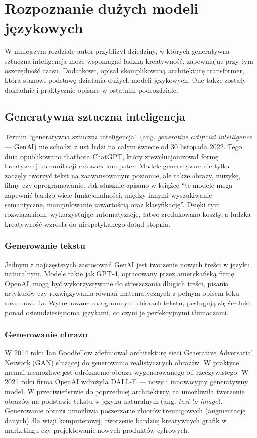 \cleardoublepage

\chapter{Rozpoznanie dużych modeli językowych}
W niniejszym rozdziale autor przybliżył dziedziny, w których generatywna sztuczna inteligencja może wspomagać ludzką kreatywność, zapewniając przy tym oszczędność czasu. Dodatkowo, opisał skomplikowaną architekturę transformer, która stanowi podstawę działania dużych modeli językowych. One także zostały dokładnie i praktycznie opisane w ostatnim podrozdziale.


    \section{Generatywna sztuczna inteligencja}
    Termin \enquote{generatywna sztuczna inteligencja} (ang. \textit{generative artificial intelligence} — GenAI) nie schodzi z ust ludzi na całym świecie od 30 listopada 2022. Tego dnia opublikowano chatbota ChatGPT, który zrewolucjonizował formę kreatywnej komunikacji człowiek-komputer. Modele generatywne nie tylko zaczęły tworzyć tekst na zaawansowanym poziomie, ale także obrazy, muzykę, filmy czy oprogramowanie. Jak słusznie opisano w książce \cite{genAI_langchain2024} \enquote{te modele mogą zapewnić bardzo wiele funkcjonalności, między innymi wyszukiwanie semantyczne, manipulowanie zawartością oraz klasyfikację}. Dzięki tym rozwiązaniom, wykorzystując automatyzację, łatwo zredukowano koszty, a ludzka kreatywność wzrosła do niespotykanego dotąd stopnia.
        

        \subsection{Generowanie tekstu}
        Jednym z najczęstszych zastosowań GenAI jest tworzenie nowych treści w języku naturalnym. Modele takie jak GPT-4, opracowany przez amerykańską firmę OpenAI, mogą być wykorzystywane do streszczania długich treści, pisania artykułów czy rozwiązywania równań matematycznych z pełnym opisem toku rozumowania. Wytrenowane na ogromnych zbiorach tekstu, posługują się średnio ponad osiemdziesięcioma językami, co czyni je perfekcyjnymi tłumaczami.
        
        
        \subsection{Generowanie obrazu}
        W 2014 roku Ian Goodfellow zdefiniował architekturę sieci Generative Adversarial Network (GAN) służącej do generowania realistycznych obrazów. W praktyce niemal niemożliwe jest odróżnienie obrazu wygenerowanego od rzeczywistego. W 2021 roku firma OpenAI wdrożyła DALL-E — nowy i innowacyjny generatywny model. W przeciwieństwie do poprzedniej architektury, ta umożliwiła tworzenie obrazów na podstawie tekstu w języku naturalnym (ang. \textit{text-to-image}). Generowanie obrazu umożliwia poszerzanie zbiorów treningowych (augmentację danych) dla wizji komputerowej, tworzenie bardziej kreatywnych grafik w marketingu czy projektowanie nowych produktów cyfrowych.
        
